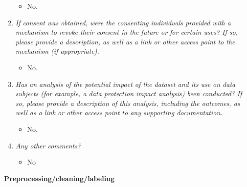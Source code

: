 \documentclass[
]{article}
\providecommand{\tightlist}{%
  \setlength{\itemsep}{0pt}\setlength{\parskip}{0pt}}
\begin{document}
\begin{enumerate}
  \begin{itemize}
  \tightlist
  \item
    No.
  \end{itemize}
\item
  \emph{If consent was obtained, were the consenting individuals provided with a mechanism to revoke their consent in the future or for certain uses? If so, please provide a description, as well as a link or other access point to the mechanism (if appropriate).}

  \begin{itemize}
  \tightlist
  \item
    No.
  \end{itemize}
\item
  \emph{Has an analysis of the potential impact of the dataset and its use on data subjects (for example, a data protection impact analysis) been conducted? If so, please provide a description of this analysis, including the outcomes, as well as a link or other access point to any supporting documentation.}

  \begin{itemize}
  \tightlist
  \item
    No.
  \end{itemize}
\item
  \emph{Any other comments?}

  \begin{itemize}
  \tightlist
  \item
    No
  \end{itemize}
\end{enumerate}

\textbf{Preprocessing/cleaning/labeling}
\end{document}
